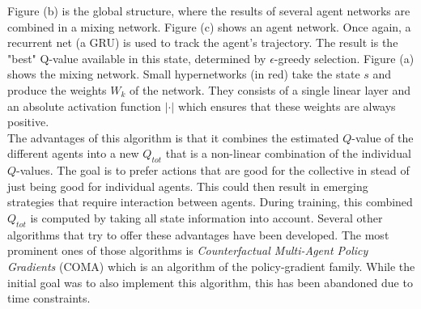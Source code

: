 Figure (b) is the global structure, where the results of several agent networks are combined in a mixing network. Figure (c) shows an agent network. Once again, a recurrent net (a GRU) is used to track the agent's trajectory. The result is the "best" Q-value available in this state, determined by $\epsilon$-greedy selection. Figure (a) shows the mixing network. Small hypernetworks (in red) take the state $s$ and produce the weights $W_k$ of the network. They consists of a single linear layer and an absolute activation function $|\cdot|$ which ensures that these weights are always positive.\\
The advantages of this algorithm is that it combines the estimated $Q$-value of the different agents into a new $Q_{tot}$ that is a non-linear combination of the individual $Q$-values. The goal is to prefer actions that are good for the collective in stead of just being good for individual agents. This could then result in emerging strategies that require interaction between agents. During training, this combined $Q_{tot}$ is computed by taking all state information into account. Several other algorithms that try to offer these advantages have been developed. The most prominent ones of those algorithms is \emph{Counterfactual Multi-Agent Policy Gradients} (COMA) \cite{foerster2018counterfactual} which is an algorithm of the policy-gradient family. While the initial goal was to also implement this algorithm, this has been abandoned due to time constraints.

